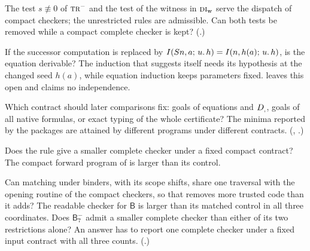 \begin{question}
\label{kern:q:bothtests}
The test $s\not\equiv 0$ of $\rulename{Tr}^{-}$ and the test of the witness
in $\rulename{DI}_{\mathrm{w}}$ serve the dispatch of compact checkers; the
unrestricted rules are admissible.  Can both tests be removed while a
compact complete checker is kept?  (.)
\end{question}

\begin{question}
\label{kern:q:forward}
If the successor computation is replaced by
$I(S n,a;\,u.\,h)=I(n,h(a);\,u.\,h)$, is the equation 
derivable?  The induction that suggests itself needs its hypothesis at the
changed seed $h(a)$, while equation induction keeps parameters fixed.
 leaves this open and claims no independence.
\end{question}

\begin{question}
\label{kern:q:contract}
Which contract should later comparisons fix: goals of equations and
$D_{,}$, goals of all native formulas, or exact typing of the whole
certificate?  The minima reported by the packages are attained by different
programs under different contracts.  (,
.)
\end{question}

\begin{question}
\label{kern:q:tfreesize}
Does the rule  give a smaller complete checker under a fixed
compact contract?  The compact forward program of  is
larger than its control.
\end{question}

\begin{question}
\label{kern:q:brepsize}
Can matching under binders, with its scope shifts, share one traversal with
the opening routine of the compact checkers, so that  removes
more trusted code than it adds?  The readable checker for $\mathsf{B}$ is
larger than its matched control in all three coordinates.  Does
$\mathsf{B}^{-}_{7}$ admit a smaller complete checker than either of its two
restrictions alone?  An answer has to report one complete checker under a
fixed input contract with all three counts.  (.)
\end{question}


